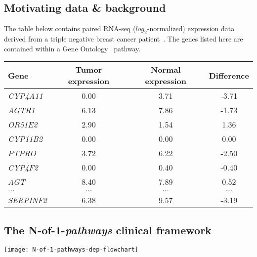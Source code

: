 \documentclass[a0,portrait]{a0poster}
\begin{document}
\begin{multicols}{3}
\subsection{Motivating data \& background}

The table below contains paired RNA-seq ($log_{2}$-normalized) expression data derived from a triple negative breast cancer patient~\cite{weinstein2013cancer}. The genes listed here are contained within a Gene Ontology~\cite{Ashburner2000} pathway.\\

\begin{tabular}{l|ccc}
\hline
Gene & Tumor expression &  Normal expression & Difference\\
\hline
  \emph{CYP4A11}   & 0.00  & 3.71  & -3.71 \\
  \emph{AGTR1}     & 6.13  & 7.86  & -1.73 \\
  \emph{OR51E2}    & 2.90  & 1.54  & 1.36 \\
  \emph{CYP11B2}   & 0.00  & 0.00  & \phantom{-}0.00 \\
  \emph{PTPRO}     & 3.72  & 6.22  & -2.50 \\
  \emph{CYP4F2}    & 0.00  & 0.40  & -0.40 \\
  \emph{AGT}       & 8.40  & 7.89  & \phantom{-}0.52 \\
  \emph{$\ldots$}       & $\ldots$  & $\ldots$  & $\ldots$ \\
  \emph{SERPINF2}  & 6.38  & 9.57  & -3.19 \\
\hline
\end{tabular}


\color{Black} %
\subsection{The N-of-1-{\itshape pathways} clinical framework~\cite{Gardeux2014}}

\begin{center}\vspace{1cm}
\texttt{[image: N-of-1-pathways-dep-flowchart]}
\end{center}%


\end{multicols}
\end{document}
